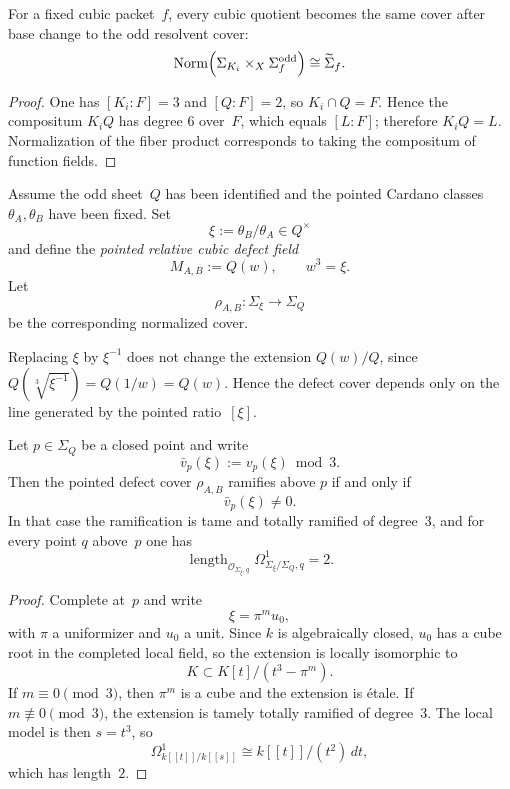 \begin{proposition}
\label{prop:base-change-to-odd-cover}
For a fixed cubic packet~$f$, every cubic quotient becomes the same cover after
base change to the odd resolvent cover:
\[
\operatorname{Norm}\Bigl(\Sigma_{K_i}\times_X\Sigma^{\mathrm{odd}}_f\Bigr)
\cong
\widetilde\Sigma_f.
\]
\end{proposition}

\begin{proof}
One has $[K_i:F]=3$ and $[Q:F]=2$, so $K_i\cap Q=F$.  Hence the compositum
$K_iQ$ has degree $6$ over~$F$, which equals $[L:F]$; therefore $K_iQ=L$.
Normalization of the fiber product corresponds to taking the compositum of
function fields.
\end{proof}

\begin{definition}
\label{def:pointed-cubic-defect-cover}
Assume the odd sheet~$Q$ has been identified and the pointed Cardano classes
$\theta_A,\theta_B$ have been fixed.  Set
\[
\xi:=\theta_B/\theta_A\in Q^{\times}
\]
and define the \emph{pointed relative cubic defect field}
\[
M_{A,B}:=Q(w),\qquad w^3=\xi.
\]
Let
\[
\rho_{A,B}\colon \Sigma_{\xi}\to \Sigma_Q
\]
be the corresponding normalized cover.
\end{definition}

\begin{remark}
\label{rem:defect-cover-inversion-invariance}
Replacing $\xi$ by $\xi^{-1}$ does not change the extension $Q(w)/Q$, since
$Q(\sqrt[3]{\xi^{-1}})=Q(1/w)=Q(w)$.  Hence the defect cover depends only on the
line generated by the pointed ratio~$[\xi]$.
\end{remark}

\begin{theorem}
\label{thm:local-cubic-ramification-criterion}
Let $p\in \Sigma_Q$ be a closed point and write
\[
\bar v_p(\xi):=v_p(\xi)\bmod 3.
\]
Then the pointed defect cover $\rho_{A,B}$ ramifies above $p$ if and only if
\[
\bar v_p(\xi)\neq 0.
\]
In that case the ramification is tame and totally ramified of degree~$3$, and
for every point $q$ above~$p$ one has
\[
\operatorname{length}_{\mathcal O_{\Sigma_{\xi},q}}
\Omega^1_{\Sigma_{\xi}/\Sigma_Q,q}=2.
\]
\end{theorem}

\begin{proof}
Complete at~$p$ and write
\[
\xi=\pi^{m}u_0,
\]
with $\pi$ a uniformizer and $u_0$ a unit.  Since $k$ is algebraically closed,
$u_0$ has a cube root in the completed local field, so the extension is locally
isomorphic to
\[
K\subset K[t]/(t^3-\pi^m).
\]
If $m\equiv 0\pmod 3$, then $\pi^m$ is a cube and the extension is étale.  If
$m\not\equiv 0\pmod 3$, the extension is tamely totally ramified of degree~$3$.
The local model is then $s=t^3$, so
\[
\Omega^1_{k[[t]]/k[[s]]}\cong k[[t]]/(t^2)\,dt,
\]
which has length~$2$.
\end{proof}

